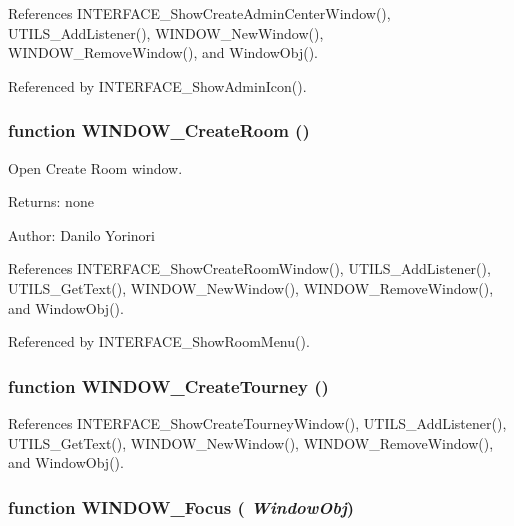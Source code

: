 References INTERFACE\_\-ShowCreateAdminCenterWindow(), UTILS\_\-AddListener(), WINDOW\_\-NewWindow(), WINDOW\_\-RemoveWindow(), and WindowObj().

Referenced by INTERFACE\_\-ShowAdminIcon().
\subsubsection[WINDOW\_\-CreateRoom]{\setlength{\rightskip}{0pt plus 5cm}function WINDOW\_\-CreateRoom ()}\label{window_2window_8js_b4a012d4090056d8eb763793e32bc5b5}


Open Create Room window. 

\begin{Desc}
\item[Returns:]none \end{Desc}
\begin{Desc}
\item[Author:]Danilo Yorinori \end{Desc}


References INTERFACE\_\-ShowCreateRoomWindow(), UTILS\_\-AddListener(), UTILS\_\-GetText(), WINDOW\_\-NewWindow(), WINDOW\_\-RemoveWindow(), and WindowObj().

Referenced by INTERFACE\_\-ShowRoomMenu().
\subsubsection[WINDOW\_\-CreateTourney]{\setlength{\rightskip}{0pt plus 5cm}function WINDOW\_\-CreateTourney ()}\label{window_2window_8js_fe14bead2b7b0e3518b2fc24e883cb09}




References INTERFACE\_\-ShowCreateTourneyWindow(), UTILS\_\-AddListener(), UTILS\_\-GetText(), WINDOW\_\-NewWindow(), WINDOW\_\-RemoveWindow(), and WindowObj().
\subsubsection[WINDOW\_\-Focus]{\setlength{\rightskip}{0pt plus 5cm}function WINDOW\_\-Focus ( {\em WindowObj})}\label{window_2window_8js_3ecef220933db0e681a958aaeeea1ebd}


